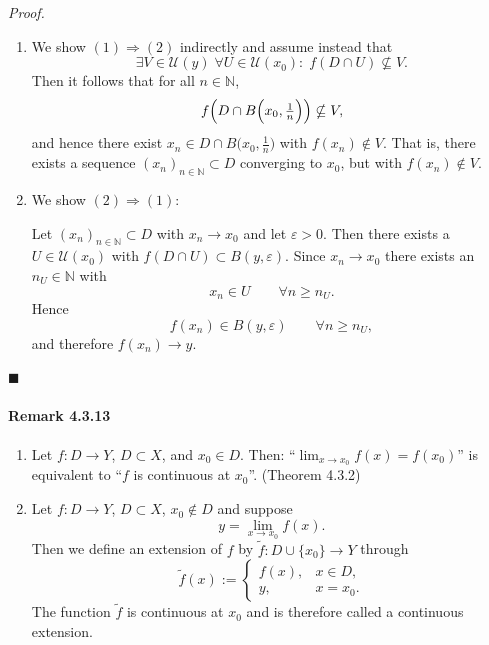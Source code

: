 \documentclass[12pt]{article}
\begin{document}
\emph{Proof.}
\begin{enumerate}[label=\alph*)]
	\item We show $(1) \Rightarrow (2)$ indirectly and assume instead that
	\[
		\exists V \in \mathcal U(y)\; \forall U \in \mathcal U(x_0):\; f(D \cap U) \nsubseteq V.
	\]
	Then it follows that for all $n \in \mathbb N$,
	\[
		f\Bigl(D \cap B\Bigl(x_0, \tfrac{1}{n}\Bigr)\Bigr) \nsubseteq V,
	\]
	and hence there exist $x_n \in D \cap B\bigl(x_0, \tfrac{1}{n}\bigr)$ with $f(x_n) \notin V$.
	That is, there exists a sequence $(x_n)_{n\in\mathbb N} \subset D$ converging to $x_0$, but with $f(x_n) \notin V$.

	\item We show $(2) \Rightarrow (1)$:
  
	Let $(x_n)_{n\in\mathbb N} \subset D$ with $x_n \to x_0$ and let $\varepsilon > 0$. Then there exists a $U \in \mathcal U(x_0)$ with $f(D \cap U) \subset B(y,\varepsilon)$. Since $x_n \to x_0$ there exists an $n_{U} \in \mathbb N$ with
	\[
		x_n \in U \qquad \forall n \ge n_U.
	\]
	Hence
	\[
		f(x_n) \in B(y,\varepsilon) \qquad \forall n \ge n_U,
	\]
	and therefore $f(x_n) \to y$.
\end{enumerate}
\hfill $\blacksquare$

\paragraph{Remark 4.3.13}
\begin{enumerate}[label=({\arabic*})]
	\item Let $f : D \to Y$, $D \subset X$, and $x_0 \in D$. Then: “$\lim_{x\to x_0} f(x) = f(x_0)$” is equivalent to “$f$ is continuous at $x_0$”. (Theorem 4.3.2)
	\item Let $f : D \to Y$, $D \subset X$, $x_0 \notin D$ and suppose
	\[
		y = \lim_{x\to x_0} f(x).
	\]
	Then we define an extension of $f$ by $\tilde f : D \cup \{x_0\} \to Y$ through
	\[
		\tilde f(x) := \begin{cases}
		f(x), & x \in D, \\
		y, & x = x_0.
		\end{cases}
	\]
	The function $\tilde f$ is continuous at $x_0$ and is therefore called a continuous extension.
\end{enumerate}
\end{document}

